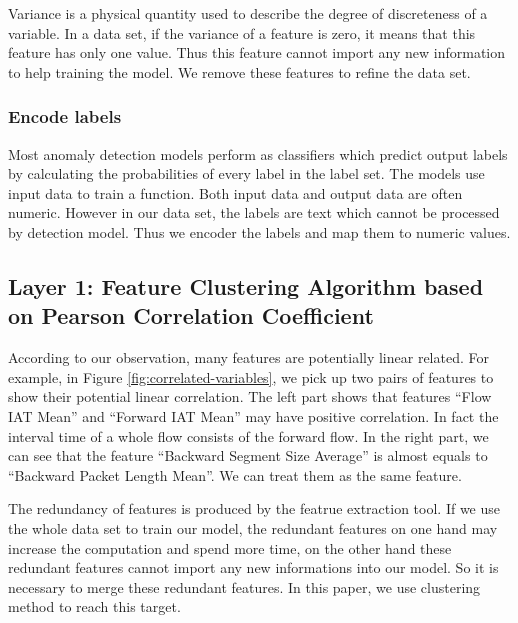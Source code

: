 \documentclass{ieeeaccess}
\theoremstyle{definition}
\begin{document}
Variance is a physical quantity used to describe the degree of discreteness of a variable. In a data set, if the variance of a feature is zero, it means that this feature has only one value. Thus this feature cannot import any new information to help training the model. We remove these features to refine the data set.

\subsubsection{Encode labels}

Most anomaly detection models perform as classifiers which predict output labels by calculating the probabilities of every label in the label set. The models use input data to train a function. Both input data and output data are often numeric. However in our data set, the labels are text which cannot be processed by detection model. Thus we encoder the labels and map them to numeric values.

\subsection{Layer 1: Feature Clustering Algorithm based on Pearson Correlation Coefficient}


According to our observation, many features are potentially linear related. For example, in Figure \ref{fig:correlated-variables}, we pick up two pairs of features to show their potential linear correlation. The left part shows that features ``Flow IAT Mean'' and ``Forward IAT Mean'' may have positive correlation. In fact the interval time of a whole flow consists of the forward flow. In the right part, we can see that the feature ``Backward Segment Size Average'' is almost equals to ``Backward Packet Length Mean''. We can treat them as the same feature. 

The redundancy of features is produced by the featrue extraction tool. If we use the whole data set to train our model, the redundant features on one hand may increase the computation and spend more time, on the other hand these redundant features cannot import any new informations into our model. So it is necessary to merge these redundant features. In this paper, we use clustering method to reach this target. 
\end{document}
